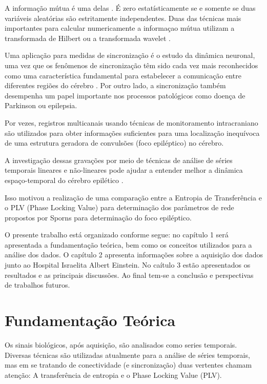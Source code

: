 \documentclass[
	12pt,				%
	openright,			%
	twoside,			%
	a4paper,			%
	english,			%
	french,				%
	spanish,			%
	brazil				%
	]{abntex2}
\begin{document}
A informação mútua é uma delas \cite{cover2012elements}. É zero estatísticamente se e somente se duas variáveis aleatórias são estritamente independentes. Duas das técnicas mais importantes para calcular numericamente a informaçao mútua utilizam a transformada de Hilbert \cite{PhysRevLett.Rosenblum} ou a transformada wavelet \cite{Lachaux}.

Uma aplicação  para medidas de sincronização é o estudo da dinâmica neuronal, uma vez que os fenômenos de sincronização têm sido cada vez mais reconhecidos como uma característica fundamental para estabelecer a comunicação entre diferentes regiões do cérebro \cite{varela2001brainweb}. Por outro lado, a sincronização também desempenha um papel importante nos processos patológicos como doença de Parkinson ou epilepsia.

Por vezes, registros multicanais usando técnicas de monitoramento intracraniano são utilizados para obter informações suficientes para uma localização inequívoca de uma estrutura geradora de convulsões (foco epiléptico) no cérebro.

A investigação dessas gravações por meio de técnicas de análise de séries temporais lineares e não-lineares pode ajudar a entender melhor a dinâmica espaço-temporal do cérebro epilético \cite{LEHNERTZ1995108}.

Isso  motivou a realização de uma comparação entre a Entropia de Transferência e o PLV (Phase Locking Value) para determinação dos parâmetros de rede propostos por Sporns \cite{sporns2010networks} para determinação do foco epiléptico.

O presente trabalho está organizado conforme segue: no capítulo 1 será apresentada a fundamentação teórica, bem como os conceitos utilizados para a análise dos dados. O capítulo 2 apresenta informações sobre a aquisição dos dados junto ao Hospital Israelita Albert Einstein. No caítulo 3 estão apresentados os resultados e as principais discussões. Ao final tem-se a conclusão e perspectivas de trabalhos futuros.






\chapter{Fundamentação Teórica}

 
Os sinais biológicos, após aquisição, são analisados como series temporais. Diversas técnicas são utilizadas atualmente para a análise de séries temporais, mas em se tratando de conectividade (e sincronização) duas vertentes chamam atenção: A transferência de entropia e o Phase Locking Value (PLV).
\end{document}
